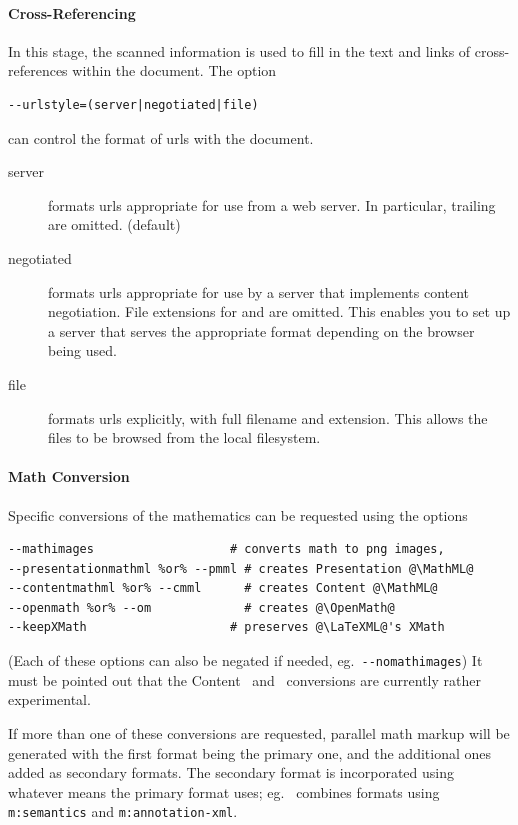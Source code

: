 \documentclass{book}
\newcommand{\shellcode}{\lstinline[style=shell]}
\begin{document}
\paragraph{Cross-Referencing}\label{usage.post.crossref}
In this stage, the scanned information is used to fill in the
text and links of cross-references within the document.
The option
\begin{lstlisting}[style=shell]
--urlstyle=(server|negotiated|file)
\end{lstlisting}
can control the format of urls with the document.
\begin{description}
  \item[server] formats urls appropriate for use from a web server.
    In particular, trailing  are omitted. (default)
  \item[negotiated] formats urls appropriate for use by a server
    that implements content negotiation. File extensions for 
    and  are omitted.  This enables you to set up a server
    that serves the appropriate format depending on the browser being used.
  \item[file] formats urls explicitly, with full filename and extension.
    This allows the files to be browsed from the local filesystem.
\end{description}

\paragraph{Math Conversion}\label{usage.post.math}
Specific conversions of the mathematics can be requested
using the options
\begin{lstlisting}[style=shell]
--mathimages                   # converts math to png images,
--presentationmathml %or% --pmml # creates Presentation @\MathML@
--contentmathml %or% --cmml      # creates Content @\MathML@
--openmath %or% --om             # creates @\OpenMath@
--keepXMath                    # preserves @\LaTeXML@'s XMath
\end{lstlisting}
(Each of these options can also be negated if needed, eg.~\shellcode{--nomathimages})
It must be pointed out that the Content \MathML\ and \OpenMath\
conversions are currently rather experimental.

If more than one of these conversions are requested,
parallel math markup will be generated with the first format
being the primary one, and the additional ones added as secondary formats.
The secondary format is incorporated using whatever means
the primary format uses; eg. \MathML\ combines formats using
\texttt{m:semantics} and \texttt{m:annotation-xml}.
\end{document}

